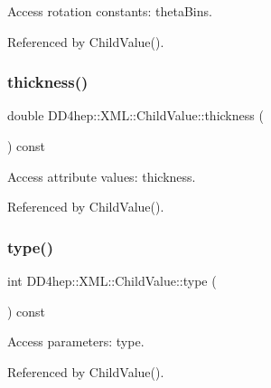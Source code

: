 Access rotation constants\+: theta\+Bins. 



Referenced by Child\+Value().

\hypertarget{struct_d_d4hep_1_1_x_m_l_1_1_child_value_ae5401e6e0d8f102da67bedaee42818b9}{}\label{struct_d_d4hep_1_1_x_m_l_1_1_child_value_ae5401e6e0d8f102da67bedaee42818b9} 
\subsubsection{\texorpdfstring{thickness()}{thickness()}}
{\footnotesize\ttfamily double D\+D4hep\+::\+X\+M\+L\+::\+Child\+Value\+::thickness (\begin{DoxyParamCaption}{ }\end{DoxyParamCaption}) const}



Access attribute values\+: thickness. 



Referenced by Child\+Value().

\hypertarget{struct_d_d4hep_1_1_x_m_l_1_1_child_value_a06a0d48b995b3d169584a35c939984b8}{}\label{struct_d_d4hep_1_1_x_m_l_1_1_child_value_a06a0d48b995b3d169584a35c939984b8} 
\subsubsection{\texorpdfstring{type()}{type()}}
{\footnotesize\ttfamily int D\+D4hep\+::\+X\+M\+L\+::\+Child\+Value\+::type (\begin{DoxyParamCaption}{ }\end{DoxyParamCaption}) const}



Access parameters\+: type. 



Referenced by Child\+Value().

\hypertarget{struct_d_d4hep_1_1_x_m_l_1_1_child_value_a6b6daea7e0ea032070ab6adf9c3711c0}{}\label{struct_d_d4hep_1_1_x_m_l_1_1_child_value_a6b6daea7e0ea032070ab6adf9c3711c0} 
